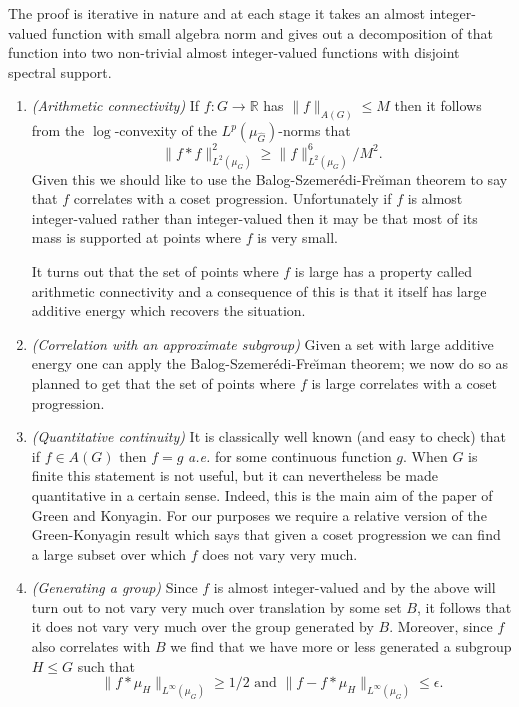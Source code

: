\documentclass[12pt]{amsart}
\numberwithin{equation}{section}
\theoremstyle{plain}
\theoremstyle{definition}
\renewcommand{\leq}{\leqslant}
\renewcommand{\geq}{\geqslant}
\newcommand{\wh}{\widehat}
\newcommand{\R}{\mathbb{R}}
\begin{document}
The proof is iterative in nature and at each stage it takes an almost integer-valued function with small algebra norm and gives out a decomposition of that function into two non-trivial almost integer-valued functions with disjoint spectral support.
\begin{enumerate}
\item \emph{(Arithmetic connectivity)} If $f:G \rightarrow \R$ has $\|f\|_{A(G)} \leq M$ then it follows from the $\log$-convexity of the $L^p(\mu_{\wh{G}})$-norms that
\begin{equation*}
\|f \ast f\|_{L^2(\mu_G)}^2 \geq \|f\|_{L^2(\mu_G)}^6/M^2.
\end{equation*}
Given this we should like to use the Balog-Szemer{\'e}di-Fre{\u\i}man theorem to say that $f$ correlates with a coset progression.  Unfortunately if $f$ is almost integer-valued rather than integer-valued then it may be that most of its mass is supported at points where $f$ is very small.  

It turns out that the set of points where $f$ is large has a property called arithmetic connectivity and a consequence of this is that it itself has large additive energy which recovers the situation.
\item \emph{(Correlation with an approximate subgroup)} Given a set with large additive energy one can apply the Balog-Szemer{\'e}di-Fre{\u\i}man theorem; we now do so as planned to get that the set of points where $f$ is large correlates with a coset progression.
\item \emph{(Quantitative continuity)} It is classically well known (and easy to check) that if $f \in A(G)$ then $f=g$ \emph{a.e.} for some continuous function $g$.  When $G$ is finite this statement is not useful, but it can nevertheless be made quantitative in a certain sense.  Indeed, this is the main aim of the paper \cite{BJGSVK} of Green and Konyagin.  For our purposes we require a relative version of the Green-Konyagin result which says that given a coset progression we can find a large subset over which $f$ does not vary very much.
\item \emph{(Generating a group)}  Since $f$ is almost integer-valued and by the above will turn out to not vary very much over translation by some set $B$, it follows that it does not vary very much over the group generated by $B$.  Moreover, since $f$ also correlates with $B$ we find that we have more or less generated a subgroup $H \leq G$ such that
\begin{equation*}
\|f \ast \mu_H\|_{L^\infty(\mu_G)} \geq 1/2 \textrm{ and } \|f - f\ast \mu_H\|_{L^\infty(\mu_G)} \leq \epsilon.
\end{equation*}
\end{enumerate}
\end{document}
